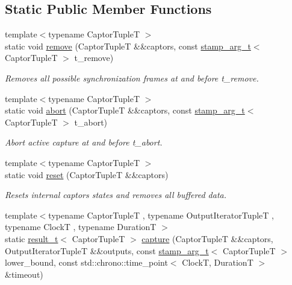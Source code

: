 \subsection*{Static Public Member Functions}
\begin{DoxyCompactItemize}
\item 
{\footnotesize template$<$typename Captor\+TupleT $>$ }\\static void \hyperlink{classflow_1_1_synchronizer_a268ae5410af9df6887bd99cb954a214d}{remove} (Captor\+TupleT \&\&captors, const \hyperlink{classflow_1_1_synchronizer_a0f1e7062475c9492191e29b26d09106c}{stamp\+\_\+arg\+\_\+t}$<$ Captor\+TupleT $>$ t\+\_\+remove)
\begin{DoxyCompactList}\small\item\em Removes all possible synchronization frames at and before {\ttfamily t\+\_\+remove}. \end{DoxyCompactList}\item 
{\footnotesize template$<$typename Captor\+TupleT $>$ }\\static void \hyperlink{classflow_1_1_synchronizer_a065371da9acc09e3459ca2c6096db1b7}{abort} (Captor\+TupleT \&\&captors, const \hyperlink{classflow_1_1_synchronizer_a0f1e7062475c9492191e29b26d09106c}{stamp\+\_\+arg\+\_\+t}$<$ Captor\+TupleT $>$ t\+\_\+abort)
\begin{DoxyCompactList}\small\item\em Abort active capture at and before {\ttfamily t\+\_\+abort}. \end{DoxyCompactList}\item 
{\footnotesize template$<$typename Captor\+TupleT $>$ }\\static void \hyperlink{classflow_1_1_synchronizer_aa598f6976190683afff9c6e45b2e5884}{reset} (Captor\+TupleT \&\&captors)
\begin{DoxyCompactList}\small\item\em Resets internal captors states and removes all buffered data. \end{DoxyCompactList}\item 
{\footnotesize template$<$typename Captor\+TupleT , typename Output\+Iterator\+TupleT , typename ClockT , typename DurationT $>$ }\\static \hyperlink{classflow_1_1_synchronizer_a4f9693650274ae93f5b9a11cb41a2d80}{result\+\_\+t}$<$ Captor\+TupleT $>$ \hyperlink{classflow_1_1_synchronizer_af8bda24c2e5ea24037d8fcaceda96885}{capture} (Captor\+TupleT \&\&captors, Output\+Iterator\+TupleT \&\&outputs, const \hyperlink{classflow_1_1_synchronizer_a0f1e7062475c9492191e29b26d09106c}{stamp\+\_\+arg\+\_\+t}$<$ Captor\+TupleT $>$ lower\+\_\+bound, const std\+::chrono\+::time\+\_\+point$<$ ClockT, DurationT $>$ \&timeout)

\end{DoxyCompactItemize}
